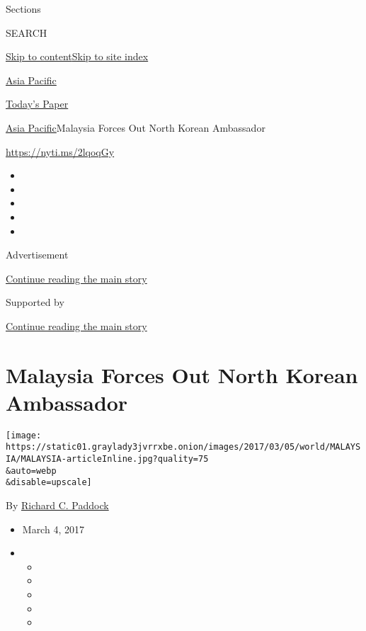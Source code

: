 Sections

SEARCH

\protect\hyperlink{site-content}{Skip to
content}\protect\hyperlink{site-index}{Skip to site index}

\href{https://www.nytimes3xbfgragh.onion/section/world/asia}{Asia
Pacific}

\href{https://myaccount.nytimes3xbfgragh.onion/auth/login?response_type=cookie\&client_id=vi}{}

\href{https://www.nytimes3xbfgragh.onion/section/todayspaper}{Today's
Paper}

\href{/section/world/asia}{Asia Pacific}\textbar{}Malaysia Forces Out
North Korean Ambassador

\url{https://nyti.ms/2lqoqGy}

\begin{itemize}
\item
\item
\item
\item
\item
\end{itemize}

Advertisement

\protect\hyperlink{after-top}{Continue reading the main story}

Supported by

\protect\hyperlink{after-sponsor}{Continue reading the main story}

\hypertarget{malaysia-forces-out-north-korean-ambassador}{%
\section{Malaysia Forces Out North Korean
Ambassador}\label{malaysia-forces-out-north-korean-ambassador}}

\texttt{[image: https://static01.graylady3jvrrxbe.onion/images/2017/03/05/world/MALAYSIA/MALAYSIA-articleInline.jpg?quality=75\\\&auto=webp\\\&disable=upscale]}

By
\href{https://www.nytimes3xbfgragh.onion/by/richard-c-paddock}{Richard
C. Paddock}

\begin{itemize}
\item
  March 4, 2017
\item
  \begin{itemize}
  \item
  \item
  \item
  \item
  \item
  \end{itemize}
\end{itemize}

